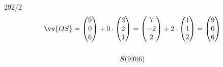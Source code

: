 \begin{exercise}{292/2}
\begin{gather*}
    \vv{OS} = \begin{pmatrix}9 \\ 0 \\ 6\end{pmatrix} + 0 \cdot \begin{pmatrix}3 \\ 2 \\ 1\end{pmatrix} = \begin{pmatrix}7 \\ -2 \\ 2\end{pmatrix} + 2 \cdot \begin{pmatrix}1 \\ 1 \\ 2\end{pmatrix} = \begin{pmatrix}9 \\ 0 \\ 6\end{pmatrix} \\\\
    S(9|0|6)
  \end{gather*}
\end{exercise}
\newpage
